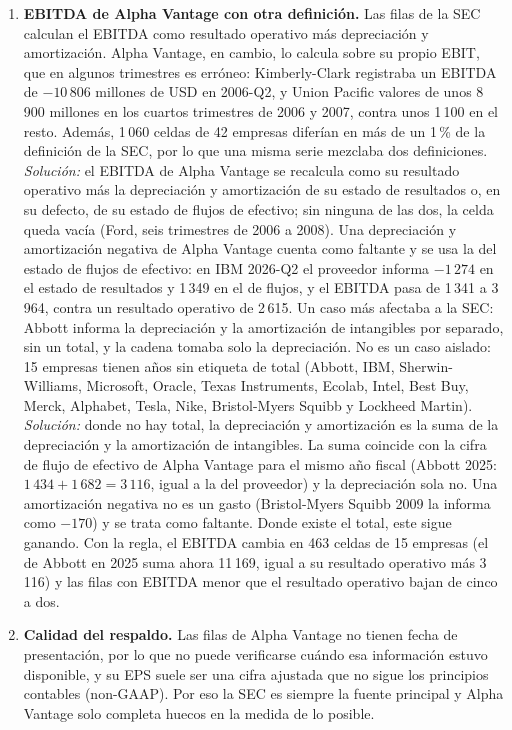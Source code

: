 \documentclass[12pt,letterpaper,oneside]{report}
\renewcommand{\_}{\UnderscoreOriginal\allowbreak}
\begin{document}
\begin{enumerate}
  \item \textbf{EBITDA de Alpha Vantage con otra definición.} Las filas de la SEC calculan el EBITDA como resultado operativo más depreciación y amortización. Alpha Vantage, en cambio, lo calcula sobre su propio EBIT, que en algunos trimestres es erróneo: Kimberly-Clark registraba un EBITDA de $-10\,806$ millones de USD en 2006-Q2, y Union Pacific valores de unos 8\,900 millones en los cuartos trimestres de 2006 y 2007, contra unos 1\,100 en el resto. Además, 1\,060 celdas de 42 empresas diferían en más de un 1\,\% de la definición de la SEC, por lo que una misma serie mezclaba dos definiciones. \emph{Solución:} el EBITDA de Alpha Vantage se recalcula como su resultado operativo más la depreciación y amortización de su estado de resultados o, en su defecto, de su estado de flujos de efectivo; sin ninguna de las dos, la celda queda vacía (Ford, seis trimestres de 2006 a 2008). Una depreciación y amortización negativa de Alpha Vantage cuenta como faltante y se usa la del estado de flujos de efectivo: en IBM 2026-Q2 el proveedor informa $-1\,274$ en el estado de resultados y 1\,349 en el de flujos, y el EBITDA pasa de 1\,341 a 3\,964, contra un resultado operativo de 2\,615. Un caso más afectaba a la SEC: Abbott informa la depreciación y la amortización de intangibles por separado, sin un total, y la cadena tomaba solo la depreciación. No es un caso aislado: 15 empresas tienen años sin etiqueta de total (Abbott, IBM, Sherwin-Williams, Microsoft, Oracle, Texas Instruments, Ecolab, Intel, Best Buy, Merck, Alphabet, Tesla, Nike, Bristol-Myers Squibb y Lockheed Martin). \emph{Solución:} donde no hay total, la depreciación y amortización es la suma de la depreciación y la amortización de intangibles. La suma coincide con la cifra de flujo de efectivo de Alpha Vantage para el mismo año fiscal (Abbott 2025: $1\,434 + 1\,682 = 3\,116$, igual a la del proveedor) y la depreciación sola no. Una amortización negativa no es un gasto (Bristol-Myers Squibb 2009 la informa como $-170$) y se trata como faltante. Donde existe el total, este sigue ganando. Con la regla, el EBITDA cambia en 463 celdas de 15 empresas (el de Abbott en 2025 suma ahora 11\,169, igual a su resultado operativo más 3\,116) y las filas con EBITDA menor que el resultado operativo bajan de cinco a dos.
  \item \textbf{Calidad del respaldo.} Las filas de Alpha Vantage no tienen fecha de presentación, por lo que no puede verificarse cuándo esa información estuvo disponible, y su EPS suele ser una cifra ajustada que no sigue los principios contables (non-GAAP). Por eso la SEC es siempre la fuente principal y Alpha Vantage solo completa huecos en la medida de lo posible.

\end{enumerate}
\end{document}
